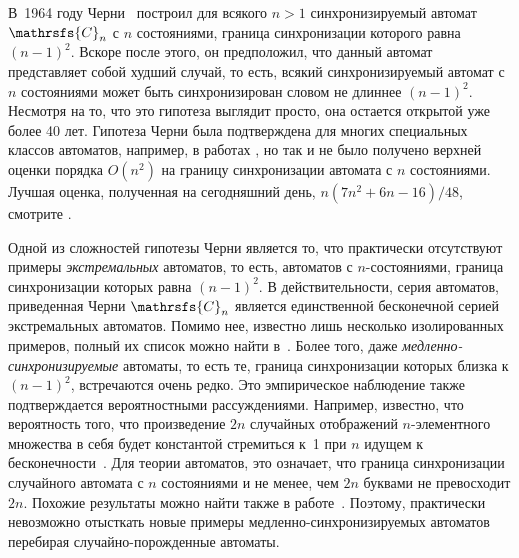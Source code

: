 \documentclass[11pt]{article}
\newcommand{\sa}{synchronizing automata}
\newcommand{\san}{synchronizing automaton}
\newcommand{\rl}{reset length}
\begin{document}
В~1964 году Черни~\cite{Ce64} построил для всякого $n>1$ синхронизируемый 
автомат $\mathrsfs{C}_n$ с $n$ состояниями, граница синхронизации которого равна $(n-1)^2$.
Вскоре после этого, он предположил, что данный автомат представляет собой худший случай,
то есть, всякий синхронизируемый автомат с $n$ состояниями может быть
синхронизирован словом не длиннее $(n-1)^2$. Несмотря на то, что это гипотеза
выглядит просто, она остается открытой уже более 40 лет. 
Гипотеза Черни была подтверждена для многих специальных классов
автоматов, например, в работах \cite{Ep90,Du98,Ka03,Tr07,Tr08,AS09,Vo09},
но так и не было получено верхней оценки порядка $O(n^2)$ на границу синхронизации автомата с $n$
состояниями. Лучшая оценка, полученная на сегодняшний день,
$n(7n^2 + 6n - 16)/48$, смотрите \cite{Tr11}.


Одной из сложностей гипотезы Черни является то, что практически отсутствуют примеры
\emph{экстремальных} автоматов, то есть, автоматов с $n$-состояниями,
граница синхронизации которых равна $(n-1)^2$. В действительности, серия автоматов,
приведенная Черни $\mathrsfs{C}_n$ является единственной бесконечной серией экстремальных
автоматов. Помимо нее, известно лишь несколько изолированных примеров, полный их список
можно найти в~\cite{Vo08}. Более того, даже \emph{медленно-синхронизируемые} автоматы, 
то есть те, граница синхронизации которых близка к $(n - 1)^2$, встречаются очень редко.
Это эмпирическое наблюдение также подтверждается вероятностными рассуждениями.
Например, известно, что вероятность того, что произведение $2n$ случайных отображений
$n$-элементного множества в себя будет константой стремиться к~1 при $n$ 
идущем к бесконечности~\cite{Hi88}. Для теории автоматов, это означает, что граница
синхронизации случайного автомата с $n$ состояниями и не менее, чем 
$2n$ буквами не превосходит $2n$. Похожие результаты можно найти также в работе~\cite{SZ}. 
Поэтому, практически невозможно отысткать новые примеры медленно-синхронизируемых автоматов
перебирая случайно-порожденные автоматы.
\end{document}
